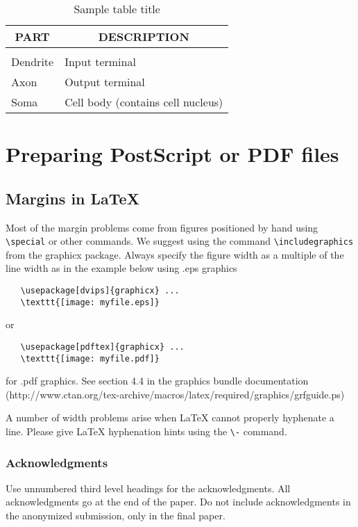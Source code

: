 \documentclass{article} %
\begin{document}
\begin{table}[t]
\caption{Sample table title}
\label{sample-table}
\begin{center}
\begin{tabular}{ll}
\multicolumn{1}{c}{\bf PART}  &\multicolumn{1}{c}{\bf DESCRIPTION}
\\ \hline \\
Dendrite         &Input terminal \\
Axon             &Output terminal \\
Soma             &Cell body (contains cell nucleus) \\
\end{tabular}
\end{center}
\end{table}

\section{Preparing PostScript or PDF files}

\subsection{Margins in LaTeX}
 
Most of the margin problems come from figures positioned by hand using
\verb+\special+ or other commands. We suggest using the command
\verb+\includegraphics+
from the graphicx package. Always specify the figure width as a multiple of
the line width as in the example below using .eps graphics
\begin{verbatim}
   \usepackage[dvips]{graphicx} ... 
   \texttt{[image: myfile.eps]} 
\end{verbatim}
or %
\begin{verbatim}
   \usepackage[pdftex]{graphicx} ... 
   \texttt{[image: myfile.pdf]} 
\end{verbatim}
for .pdf graphics. 
See section 4.4 in the graphics bundle documentation (http://www.ctan.org/tex-archive/macros/latex/required/graphics/grfguide.ps) 
 
A number of width problems arise when LaTeX cannot properly hyphenate a
line. Please give LaTeX hyphenation hints using the \verb+\-+ command.


\subsubsection*{Acknowledgments}

Use unnumbered third level headings for the acknowledgments. All
acknowledgments go at the end of the paper. Do not include 
acknowledgments in the anonymized submission, only in the 
final paper. 



\end{document}
